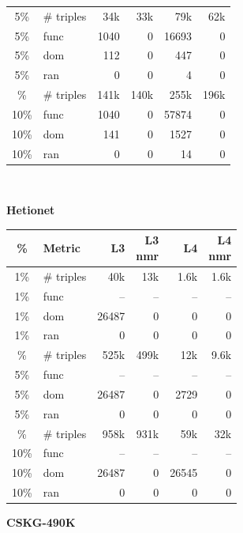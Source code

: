 \documentclass[a4paper,UKenglish,cleveref, autoref, thm-restate]{tgdk-v2021}
\begin{document}
\begin{table}[]
\begin{minipage}[t]{0.49\linewidth}
\begin{tabular}{c l | r r r r}
5\% & \# triples & 34k & 33k & 79k & 62k \\
5\% & func & 1040 & 0 & 16693 & 0 \\
5\% & dom & 112 & 0 & 447 & 0 \\
5\% & ran & 0 & 0 & 4 & 0 \\
\addlinespace
10\% & \# triples & 141k & 140k & 255k & 196k \\
10\% & func & 1040 & 0 & 57874 & 0 \\
10\% & dom & 141 & 0 & 1527 & 0 \\
10\% & ran & 0 & 0 & 14 & 0 \\
\bottomrule
\end{tabular}
\end{minipage}\\[2ex]

\begin{minipage}[t]{0.49\linewidth}
\centering
\textbf{Hetionet}\\
\begin{tabular}{c l | r r r r}
\toprule
\% & Metric & L3 & \shortstack{L3\\nmr} & L4 & \shortstack{L4\\nmr} \\
\midrule
1\%  & \# triples & 40k & 13k & 1.6k & 1.6k \\
1\%  & func      & -- & -- & -- & -- \\
1\%  & dom       & 26487 & 0 & 0 & 0 \\
1\%  & ran       & 0 & 0 & 0 & 0 \\
\addlinespace
5\%  & \# triples & 525k & 499k & 12k & 9.6k \\
5\%  & func      & -- & -- & -- & -- \\
5\%  & dom       & 26487 & 0 & 2729 & 0 \\
5\%  & ran       & 0 & 0 & 0 & 0 \\
\addlinespace
10\% & \# triples & 958k & 931k & 59k & 32k \\
10\% & func      & -- & -- & -- & -- \\
10\% & dom       & 26487 & 0 & 26545 & 0 \\
10\% & ran       & 0 & 0 & 0 & 0 \\
\bottomrule
\end{tabular}
\end{minipage}%
\hfill
\begin{minipage}[t]{0.49\linewidth}
\centering
\textbf{CSKG-490K}\\
\begin{tabular}{c l | r r r r}

\end{tabular}
\end{minipage}
\end{table}
\end{document}
